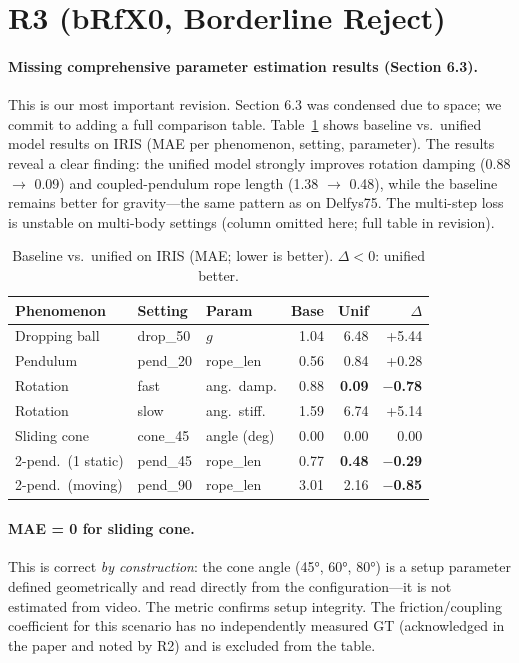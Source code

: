 \documentclass[10pt,twocolumn,letterpaper]{article}
\begin{document}
\section{R3 (bRfX0, Borderline Reject)}

\paragraph{Missing comprehensive parameter estimation results (Section 6.3).}
This is our most important revision. Section 6.3 was condensed due to space; we commit to adding a full comparison table. Table~\ref{tab:iris_results} shows baseline vs.\ unified model results on IRIS (MAE per phenomenon, setting, parameter). The results reveal a clear finding: the unified model strongly improves rotation damping (0.88 $\to$ 0.09) and coupled-pendulum rope length (1.38 $\to$ 0.48), while the baseline remains better for gravity---the same pattern as on Delfys75. The multi-step loss is unstable on multi-body settings (column omitted here; full table in revision).

\begin{table}[h]
\centering
\caption{Baseline vs.\ unified on IRIS (MAE; lower is better). $\Delta < 0$: unified better.}
\label{tab:iris_results}
\small
\setlength{\tabcolsep}{3pt}
\begin{tabular}{@{}lllrrr@{}}
\toprule
Phenomenon & Setting & Param & Base & Unif & $\Delta$ \\
\midrule
Dropping ball & drop\_50  & $g$            & 1.04 & 6.48 & +5.44 \\
Pendulum      & pend\_20  & rope\_len       & 0.56 & 0.84 & +0.28 \\
Rotation      & fast      & ang.\ damp.     & 0.88 & \textbf{0.09} & \textbf{$-$0.78} \\
Rotation      & slow      & ang.\ stiff.    & 1.59 & 6.74 & +5.14 \\
Sliding cone  & cone\_45  & angle (deg)     & 0.00 & 0.00 & 0.00 \\
2-pend.\ (1 static) & pend\_45 & rope\_len & 0.77 & \textbf{0.48} & \textbf{$-$0.29} \\
2-pend.\ (moving) & pend\_90 & rope\_len   & 3.01 & 2.16 & \textbf{$-$0.85} \\
\bottomrule
\end{tabular}
\end{table}

\paragraph{MAE = 0 for sliding cone.}
This is correct \emph{by construction}: the cone angle (45°, 60°, 80°) is a setup parameter defined geometrically and read directly from the configuration---it is not estimated from video. The metric confirms setup integrity. The friction/coupling coefficient for this scenario has no independently measured GT (acknowledged in the paper and noted by R2) and is excluded from the table.
\end{document}
